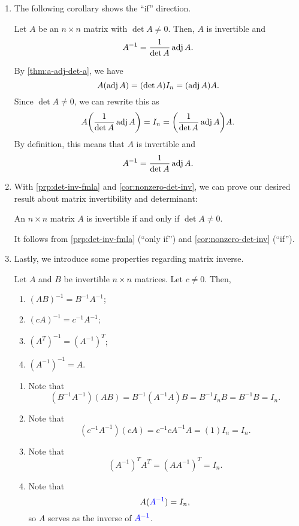 \begin{enumerate}
\item The following corollary shows the ``if'' direction.
\begin{corollary}
\label{cor:nonzero-det-inv}
Let \(A\) be an \(n\times n\) matrix with \(\det A\ne 0\). Then, \(A\) is
invertible and
\[
A^{-1}=\frac{1}{\det A}\operatorname{adj} A.
\]
\end{corollary}
\begin{pf}
By \cref{thm:a-adj-det-a}, we have
\[
A(\operatorname{adj} A)=(\det A)I_n=(\operatorname{adj} A)A.
\]
Since \(\det A\ne 0\), we can rewrite this as
\[
A\qty(\frac{1}{\det A}\operatorname{adj} A)=I_n=\qty(\frac{1}{\det A}\operatorname{adj} A)A.
\]
By definition, this means that \(A\) is invertible and
\[
A^{-1}=\frac{1}{\det A}\operatorname{adj} A.
\]
\end{pf}
\item With \cref{prp:det-inv-fmla} and \cref{cor:nonzero-det-inv}, we can prove
our desired result about matrix invertibility and determinant:
\begin{theorem}
\label{thm:inv-iff-nonzero-det}
An \(n\times n\) matrix \(A\) is invertible if and only if \(\det A\ne 0\).
\end{theorem}
\begin{pf}
It follows from \cref{prp:det-inv-fmla} (``only if'') and
\cref{cor:nonzero-det-inv} (``if'').
\end{pf}
\item Lastly, we introduce some properties regarding matrix inverse.
\begin{proposition}
\label{prp:matrix-inv-prop}
Let \(A\) and \(B\) be invertible \(n\times n\) matrices. Let \(c\ne 0\). Then,
\begin{enumerate}
\item \((AB)^{-1}=B^{-1}A^{-1}\);
\item \((cA)^{-1}=c^{-1}A^{-1}\);
\item \((A^{T})^{-1}=(A^{-1})^{T}\);
\item \((A^{-1})^{-1}=A\).
\end{enumerate}
\end{proposition}
\begin{pf}
\begin{enumerate}
\item Note that
\[
(B^{-1}A^{-1})(AB)=B^{-1}(A^{-1}A)B=B^{-1}I_nB=B^{-1}B=I_n.
\]
\item Note that
\[
(c^{-1}A^{-1})(cA)=c^{-1}cA^{-1}A=(1)I_n=I_n.
\]
\item Note that
\[
(A^{-1})^{T}A^{T}=(AA^{-1})^{T}=I_n.
\]
\item Note that
\[
A({\color{blue}A^{-1}})=I_n,
\]
so \(A\) serves as the inverse of \({\color{blue}A^{-1}}\).
\end{enumerate}
\end{pf}
\end{enumerate}
